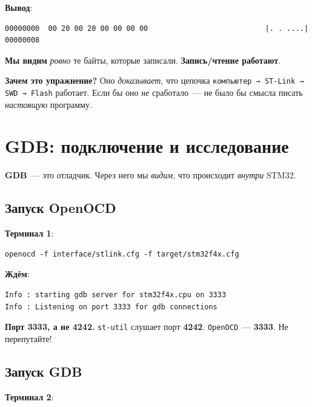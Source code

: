 \textbf{Вывод}:

\begin{verbatim}
00000000  00 20 00 20 00 00 00 00                           |. . ....|
00000008
\end{verbatim}

\textbf{Мы видим} \emph{ровно} те байты, которые записали.
\textbf{Запись/чтение работают}.

\begin{ideabox}
\textbf{Зачем это упражнение?} Оно \emph{доказывает},
что цепочка \texttt{компьютер → ST-Link → SWD → Flash}
работает. Если бы оно \emph{не} сработало~---
не было бы смысла писать \emph{настоящую} программу.
\end{ideabox}

\section{GDB: подключение и исследование}
\label{sec:flashing-gdb}

\textbf{GDB}~--- это отладчик. Через него мы \emph{видим},
что происходит \emph{внутри} STM32.

\subsection{Запуск OpenOCD}

\textbf{Терминал 1}:

\begin{verbatim}
openocd -f interface/stlink.cfg -f target/stm32f4x.cfg
\end{verbatim}

\textbf{Ждём}:

\begin{verbatim}
Info : starting gdb server for stm32f4x.cpu on 3333
Info : Listening on port 3333 for gdb connections
\end{verbatim}

\begin{warnbox}
\textbf{Порт 3333, а не 4242.} \texttt{st-util} слушает
порт \textbf{4242}. \texttt{OpenOCD}~--- \textbf{3333}.
Не перепутайте!
\end{warnbox}

\subsection{Запуск GDB}

\textbf{Терминал 2}:

